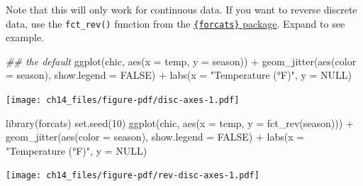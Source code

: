 \documentclass[
  letterpaper,
]{scrbook}
\newenvironment{Shaded}{\begin{snugshade}}{\end{snugshade}}
\newcommand{\AttributeTok}[1]{\textcolor[rgb]{0.40,0.45,0.13}{#1}}
\newcommand{\ConstantTok}[1]{\textcolor[rgb]{0.56,0.35,0.01}{#1}}
\newcommand{\DecValTok}[1]{\textcolor[rgb]{0.68,0.00,0.00}{#1}}
\newcommand{\DocumentationTok}[1]{\textcolor[rgb]{0.37,0.37,0.37}{\textit{#1}}}
\newcommand{\FunctionTok}[1]{\textcolor[rgb]{0.28,0.35,0.67}{#1}}
\newcommand{\NormalTok}[1]{\textcolor[rgb]{0.00,0.23,0.31}{#1}}
\newcommand{\SpecialCharTok}[1]{\textcolor[rgb]{0.37,0.37,0.37}{#1}}
\newcommand{\StringTok}[1]{\textcolor[rgb]{0.13,0.47,0.30}{#1}}
\begin{document}
\begin{tcolorbox}[enhanced jigsaw, rightrule=.15mm, arc=.35mm, title=\textcolor{quarto-callout-note-color}{\faInfo}\hspace{0.5em}{Note}, colback=white, toptitle=1mm, colbacktitle=quarto-callout-note-color!10!white, breakable, left=2mm, opacityback=0, leftrule=.75mm, bottomrule=.15mm, bottomtitle=1mm, colframe=quarto-callout-note-color-frame, coltitle=black, toprule=.15mm, opacitybacktitle=0.6, titlerule=0mm]

Note that this will only work for continuous data. If you want to
reverse discrete data, use the \texttt{fct\_rev()} function from the
\href{https://forcats.tidyverse.org/}{\texttt{\{forcats\}} package}.
Expand to see example.

\begin{Shaded}
\begin{Highlighting}[]
\DocumentationTok{\#\# the default}
\FunctionTok{ggplot}\NormalTok{(chic, }\FunctionTok{aes}\NormalTok{(}\AttributeTok{x =}\NormalTok{ temp, }\AttributeTok{y =}\NormalTok{ season)) }\SpecialCharTok{+}
  \FunctionTok{geom\_jitter}\NormalTok{(}\FunctionTok{aes}\NormalTok{(}\AttributeTok{color =}\NormalTok{ season), }\AttributeTok{show.legend =} \ConstantTok{FALSE}\NormalTok{) }\SpecialCharTok{+}
  \FunctionTok{labs}\NormalTok{(}\AttributeTok{x =} \StringTok{"Temperature (°F)"}\NormalTok{, }\AttributeTok{y =} \ConstantTok{NULL}\NormalTok{)}
\end{Highlighting}
\end{Shaded}

\texttt{[image: ch14\_files/figure-pdf/disc-axes-1.pdf]}

\begin{Shaded}
\begin{Highlighting}[]
\FunctionTok{library}\NormalTok{(forcats)}
\FunctionTok{set.seed}\NormalTok{(}\DecValTok{10}\NormalTok{)}
\FunctionTok{ggplot}\NormalTok{(chic, }\FunctionTok{aes}\NormalTok{(}\AttributeTok{x =}\NormalTok{ temp, }\AttributeTok{y =} \FunctionTok{fct\_rev}\NormalTok{(season))) }\SpecialCharTok{+}
  \FunctionTok{geom\_jitter}\NormalTok{(}\FunctionTok{aes}\NormalTok{(}\AttributeTok{color =}\NormalTok{ season), }\AttributeTok{show.legend =} \ConstantTok{FALSE}\NormalTok{) }\SpecialCharTok{+}
  \FunctionTok{labs}\NormalTok{(}\AttributeTok{x =} \StringTok{"Temperature (°F)"}\NormalTok{, }\AttributeTok{y =} \ConstantTok{NULL}\NormalTok{)}
\end{Highlighting}
\end{Shaded}

\texttt{[image: ch14\_files/figure-pdf/rev-disc-axes-1.pdf]}

\end{tcolorbox}
\end{document}
